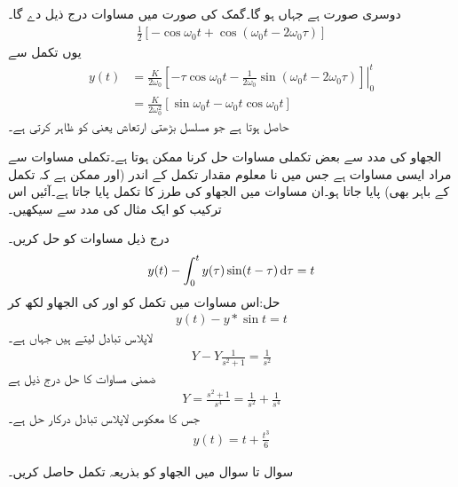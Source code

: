  دوسری صورت ہے جہاں  ہو گا۔گمک کی صورت میں مساوات  درج ذیل دے گا۔
\begin{align*}
\frac{1}{2}[-\cos \omega_0 t+\cos(\omega_0 t-2\omega_0 \tau)]
\end{align*}
یوں تکمل سے
\begin{align*}
y(t)&=\left. \frac{K}{2\omega_0}[-\tau \cos \omega_0 t-\frac{1}{2\omega_0} \sin(\omega_0 t-2\omega_0 \tau)] \right|_{0}^{t}\\
&=\frac{K}{2\omega_0^2}[\sin \omega_0 t-\omega_0 t \cos \omega_0 t]
\end{align*}
حاصل ہوتا ہے جو مسلسل بڑھتی ارتعاش یعنی  کو ظاہر کرتی ہے۔

الجھاو کی مدد سے بعض تکملی مساوات حل کرنا ممکن ہوتا ہے۔تکملی مساوات سے مراد ایسی مساوات ہے جس میں نا معلوم  مقدار  تکمل کے اندر (اور ممکن ہے کہ تکمل کے باہر بھی) پایا جاتا ہو۔ان مساوات میں الجھاو کی طرز کا تکمل پایا جاتا ہے۔آئیں اس ترکیب کو ایک مثال کی مدد سے سیکھیں۔

درج ذیل مساوات کو حل کریں۔
\begin{align*}
y(t)-\int_{0}^{t}y(\tau)\sin(t-\tau)\dif \tau=t
\end{align*}
حل:اس مساوات میں تکمل کو  اور  کی الجھاو  لکھ کر
\begin{align*}
y(t)-y*\sin t=t
\end{align*}
لاپلاس تبادل لیتے ہیں جہاں  ہے۔
\begin{align*}
Y-Y\frac{1}{s^2+1}=\frac{1}{s^2}
\end{align*}
ضمنی مساوات کا حل درج ذیل ہے
\begin{align*}
Y=\frac{s^2+1}{s^4}=\frac{1}{s^2}+\frac{1}{s^4}
\end{align*}
جس کا معکوس لاپلاس تبادل درکار حل ہے۔
\begin{align*}
y(t)=t+\frac{t^3}{6}
\end{align*}

سوال  تا سوال  میں الجھاو کو  بذریعہ تکمل حاصل کریں۔

